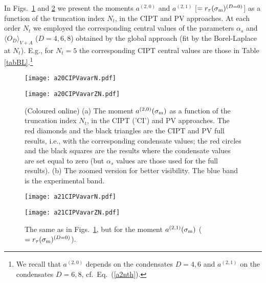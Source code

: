 \documentclass[aps,nofootinbib,showkeys,noshowpacs,preprintnumbers,amsmath,amssymb]{revtex4}
\newcommand{\sm}{{\sigma_{\rm m}}}
\begin{document}
In Figs.~\ref{a20CIPVavar} and \ref{a21CIPVavar} we present the moments $a^{(2,0)}$ and $a^{(2,1)}$ [$=r_{\tau}(\sm)^{(D=0)}$] as a function of the truncation index $N_t$, in the CIPT and PV approaches. At each order $N_t$ we employed the corresponding central values of the parameters $\alpha_s$ and $\langle O_D \rangle_{V+A}$ ($D=4,6,8$) obtained by the global approach (fit by the Borel-Laplace at $N_t$). E.g., for $N_t=5$ the corresponding CIPT central values are those in Table \ref{tabBL}.\footnote{We recall that  $a^{(2,0)}$ depends on the condensates $D=4,6$ and $a^{(2,1)}$ on the condensates $D=6,8$, cf.~Eq.~(\ref{a2nth}).} 
\begin{figure}[htb] 
\begin{minipage}[b]{.49\linewidth}
  \centering\texttt{[image: a20CIPVavarN.pdf]}
  \end{minipage}
\begin{minipage}[b]{.49\linewidth}
  \centering\texttt{[image: a20CIPVavarZN.pdf]}
\end{minipage}
\vspace{-0.2cm}
\caption{\footnotesize  (Coloured online) (a) The moment $a^{(2,0)}(\sm)$ as a function of the truncation index $N_t$, in the CIPT ('CI') and PV approaches. The red diamonds and the black triangles are the CIPT and PV full results, i.e., with the corresponding condensate values; the red circles and the black squares are the results where the condensate values are set equal to zero (but $\alpha_s$ values are those used for the full results).  (b) The zoomed version for better visibility. The blue band is the experimental band.}
\label{a20CIPVavar}
\end{figure}
\begin{figure}[htb] 
\begin{minipage}[b]{.49\linewidth}
  \centering\texttt{[image: a21CIPVavarN.pdf]}
  \end{minipage}
\begin{minipage}[b]{.49\linewidth}
  \centering\texttt{[image: a21CIPVavarZN.pdf]}
\end{minipage}
\vspace{-0.2cm}
\caption{\footnotesize  The same as in Figs.~\ref{a20CIPVavar}, but for the moment $a^{(2,1)}(\sm)$ ($= r_{\tau}(\sm)^{(D=0)}$).}
\label{a21CIPVavar}
\end{figure}
\end{document}
